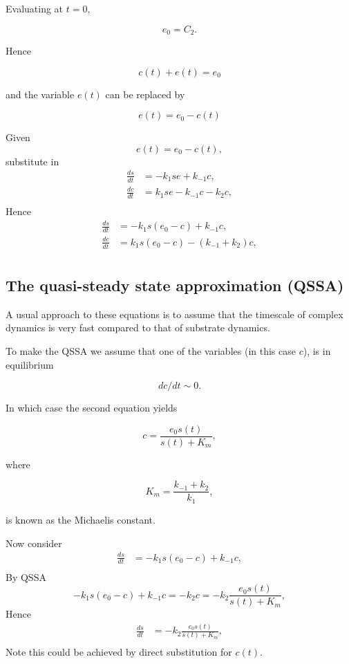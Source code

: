 \documentclass[
  letterpaper,
  DIV=11,
  numbers=noendperiod]{scrreprt}
\begin{document}
Evaluating at \(t=0\),

\[
e_0=C_2.
\]

Hence

\[
c(t)+e(t)=e_0
\]

and the variable \(e(t)\) can be replaced by

\[
 e(t)=e_0-c(t)
\]

Given \[
 e(t)=e_0-c(t),
\] substitute in \[
\begin{aligned}
\frac{d s}{dt} &= -k_1 se + k_{-1}c, \nonumber \\
\frac{d c}{dt} &= k_1 se - k_{-1}c-k_2c, \nonumber \\
\end{aligned}
\] Hence \[
\begin{aligned}
\frac{d s}{dt} &= -k_1 s(e_0-c) + k_{-1}c, \nonumber \\
\frac{d c}{dt} &= k_1 s(e_0-c) - (k_{-1}+k_2)c, \nonumber \\
\end{aligned}
\]

\hypertarget{the-quasi-steady-state-approximation-qssa}{%
\subsection{The quasi-steady state approximation
(QSSA)}\label{the-quasi-steady-state-approximation-qssa}}

A usual approach to these equations is to assume that the timescale of
complex dynamics is very fast compared to that of substrate dynamics.

To make the QSSA we assume that one of the variables (in this case
\(c\)), is in equilibrium

\[
dc/dt \sim 0.
\]

In which case the second equation yields

\[
c=\frac{e_0s(t)}{s(t)+K_m}, 
\]

where

\[
 K_m=\frac{k_{-1}+k_2}{k_1},
\]

is known as the Michaelis constant.

Now consider \[
\begin{aligned}
\frac{d s}{dt} &= -k_1 s(e_0-c) + k_{-1}c, \nonumber \\
\end{aligned}
\] By QSSA \[
-k_1 s(e_0-c) + k_{-1}c=-k_2c=-k_2\frac{e_0s(t)}{s(t)+K_m},
\] Hence \[
\begin{aligned}
\frac{d s}{dt} &= -k_2\frac{e_0s(t)}{s(t)+K_m}, \nonumber \\
\end{aligned}
\] Note this could be achieved by direct substitution for \(c(t)\).
\end{document}

